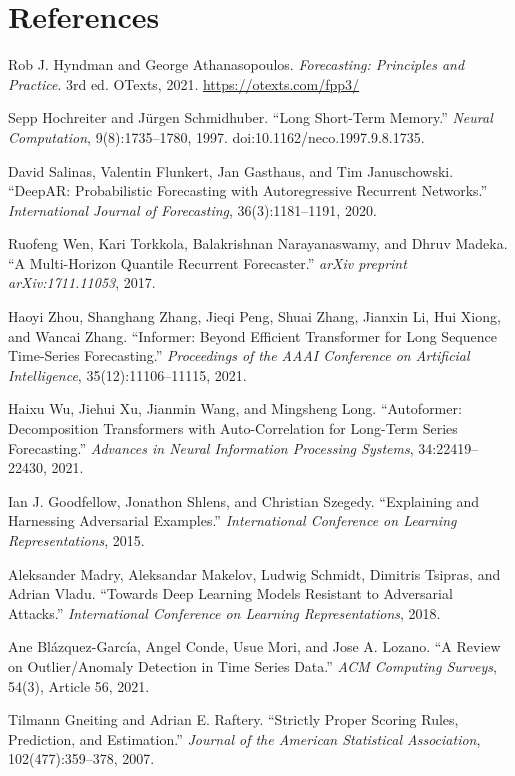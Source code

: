 \documentclass[11pt,a4paper]{article}
\begin{document}
\section*{References}

\begin{enumerate}[label={[\arabic*]}]
  \item Rob J. Hyndman and George Athanasopoulos. \emph{Forecasting: Principles and Practice}. 3rd ed. OTexts, 2021. \url{https://otexts.com/fpp3/}

  \item Sepp Hochreiter and J\"{u}rgen Schmidhuber. ``Long Short-Term Memory.'' \emph{Neural Computation}, 9(8):1735--1780, 1997. doi:10.1162/neco.1997.9.8.1735.

  \item David Salinas, Valentin Flunkert, Jan Gasthaus, and Tim Januschowski. ``DeepAR: Probabilistic Forecasting with Autoregressive Recurrent Networks.'' \emph{International Journal of Forecasting}, 36(3):1181--1191, 2020.

  \item Ruofeng Wen, Kari Torkkola, Balakrishnan Narayanaswamy, and Dhruv Madeka. ``A Multi-Horizon Quantile Recurrent Forecaster.'' \emph{arXiv preprint arXiv:1711.11053}, 2017.

  \item Haoyi Zhou, Shanghang Zhang, Jieqi Peng, Shuai Zhang, Jianxin Li, Hui Xiong, and Wancai Zhang. ``Informer: Beyond Efficient Transformer for Long Sequence Time-Series Forecasting.'' \emph{Proceedings of the AAAI Conference on Artificial Intelligence}, 35(12):11106--11115, 2021.

  \item Haixu Wu, Jiehui Xu, Jianmin Wang, and Mingsheng Long. ``Autoformer: Decomposition Transformers with Auto-Correlation for Long-Term Series Forecasting.'' \emph{Advances in Neural Information Processing Systems}, 34:22419--22430, 2021.

  \item Ian J. Goodfellow, Jonathon Shlens, and Christian Szegedy. ``Explaining and Harnessing Adversarial Examples.'' \emph{International Conference on Learning Representations}, 2015.

  \item Aleksander Madry, Aleksandar Makelov, Ludwig Schmidt, Dimitris Tsipras, and Adrian Vladu. ``Towards Deep Learning Models Resistant to Adversarial Attacks.'' \emph{International Conference on Learning Representations}, 2018.

  \item Ane Bl\'{a}zquez-Garc\'{i}a, Angel Conde, Usue Mori, and Jose A. Lozano. ``A Review on Outlier/Anomaly Detection in Time Series Data.'' \emph{ACM Computing Surveys}, 54(3), Article 56, 2021.

  \item Tilmann Gneiting and Adrian E. Raftery. ``Strictly Proper Scoring Rules, Prediction, and Estimation.'' \emph{Journal of the American Statistical Association}, 102(477):359--378, 2007.
\end{enumerate}
\end{document}
